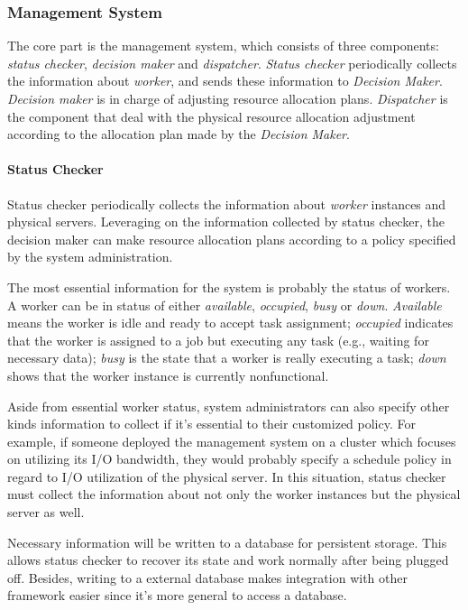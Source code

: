 \subsubsection{Management System}	%

The core part is the management system, which consists of three
components: {\em status checker}, {\em decision maker} and {\em
dispatcher}.
{\em Status checker} periodically collects the information about {\em
worker}, and sends these information to {\em Decision Maker}.
{\em Decision maker} is in charge of adjusting resource allocation
plans.
{\em Dispatcher} is the component that deal with the physical resource
allocation adjustment according to the allocation plan made by the {\em
Decision Maker}.


\paragraph{Status Checker}	%

Status checker periodically collects the information about {\em worker}
instances and physical servers.
Leveraging on the information collected by status checker, the decision
maker can make resource allocation plans according to a policy specified
by the system administration.

The most essential information for the system is probably the status of
workers.
A worker can be in status of either {\em available}, {\em occupied},
{\em busy} or {\em down}.
{\em Available} means the worker is idle and ready to accept task
assignment; {\em occupied} indicates that the worker is assigned to a
job but executing any task (e.g., waiting for necessary data); {\em
busy} is the state that a worker is really executing a task; {\em down}
shows that the worker instance is currently nonfunctional. 

Aside from essential worker status, system administrators can also
specify other kinds information to collect if it's essential to  their
customized policy.
For example, if someone deployed the management system on a cluster
which focuses on utilizing its I/O bandwidth, they would probably
specify a schedule policy in regard to I/O utilization of the physical
server.
In this situation, status checker must collect the information about not
only the worker instances but the physical server as well.

Necessary information will be written to a database for persistent
storage.
This allows status checker to recover its state and work normally after
being plugged off.
Besides, writing to a external database makes integration with other
framework easier since it's more general to access a database.


